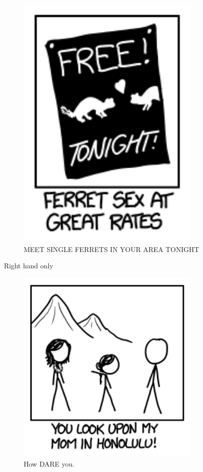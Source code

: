 {\begin{figure}[!htbp]
\centering
\includegraphics[scale=0.5, max width=0.8\textwidth]{imgs/a/75/t9_ferret.png}
\caption{MEET SINGLE FERRETS IN YOUR AREA TONIGHT}
\end{figure}

{Right hand only}

\begin{figure}[!htbp]
\centering
\includegraphics[scale=0.5, max width=0.8\textwidth]{imgs/a/75/t9_honolulu.png}
\caption{How DARE you.}
\end{figure}

}
